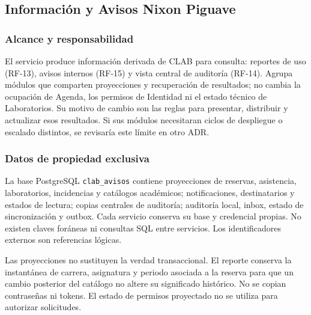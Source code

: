 \subsection{Información y Avisos \hfill Nixon Piguave}
\label{subsec:avisos-nixon}

\subsubsection{Alcance y responsabilidad}
El servicio produce información derivada de CLAB para consulta: reportes
de uso (RF-13), avisos internos (RF-15) y vista central de auditoría
(RF-14). Agrupa módulos que comparten proyecciones y recuperación de
resultados; no cambia la ocupación de Agenda, los permisos de Identidad ni
el estado técnico de Laboratorios. Su motivo de cambio son las reglas para
presentar, distribuir y actualizar esos resultados. Si sus módulos
necesitaran ciclos de despliegue o escalado distintos, se revisaría este
límite en otro ADR.

\subsubsection{Datos de propiedad exclusiva}
La base PostgreSQL \texttt{clab\_avisos} contiene proyecciones de reservas,
asistencia, laboratorios, incidencias y catálogos académicos; notificaciones,
destinatarios y estados de lectura; copias centrales de auditoría; auditoría
local, inbox, estado de sincronización y outbox. Cada servicio conserva
su base y credencial propias. No existen claves foráneas ni consultas SQL
entre servicios. Los identificadores externos son referencias lógicas.

Las proyecciones no sustituyen la verdad transaccional. El reporte conserva
la instantánea de carrera, asignatura y periodo asociada a la reserva para
que un cambio posterior del catálogo no altere su significado histórico.
No se copian contraseñas ni tokens. El estado de permisos proyectado no se
utiliza para autorizar solicitudes.

